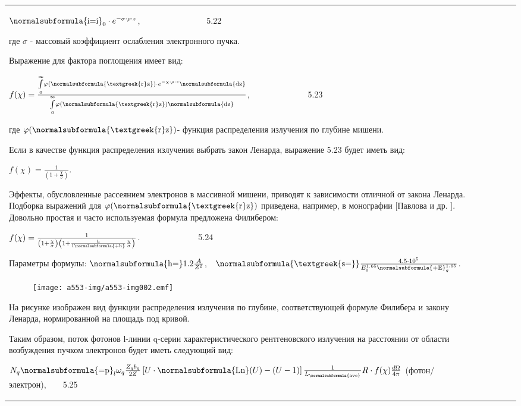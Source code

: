 \documentclass[a4paper,14pt, openany, twoside, draft]{extbook} %
\begin{document}
\begin{flushleft}
\begin{supertabular}{|m{1.7279999cm}|m{1.522cm}|m{1.522cm}|m{1.522cm}|m{1.744cm}|}
 $\normalsubformula{\text{i=i}}_0\cdot e^{-\sigma \cdot \rho \cdot z}$,\ \ \ \ \ \ \ \ \ \ \ \ \ \ \ \ 5.22

где ${\sigma}$ - массовый коэффициент ослабления электронного пучка.

Выражение для фактора поглощения имеет вид:

 $f(\chi )=\frac{\overset{\infty }{\underset 0{\int }}\varphi (\normalsubformula{\text{\textgreek{r}z}})\cdot e^{-\chi \cdot \rho \cdot z}\normalsubformula{\text{dz}}}{\overset{\infty }{\underset 0{\int }}\varphi (\normalsubformula{\text{\textgreek{r}z}})\normalsubformula{\text{dz}}}$,\ \ \ \ \ \ \ \ \ \ \ \ \ \ 5.23

где  $\varphi (\normalsubformula{\text{\textgreek{r}z}})${}- функция распределения излучения по глубине мишени.

Если в качестве функция распределения излучения выбрать закон Ленарда, выражение 5.23 будет иметь вид:

 $f(\chi )=\frac 1{\left(1+\frac{\chi }{\sigma }\right)}$.

Эффекты, обусловленные рассеянием электронов в массивной мишени, приводят к зависимости отличной от закона Ленарда. Подборка выражений для  $\varphi (\normalsubformula{\text{\textgreek{r}z}})$ приведена, например, в монографии [Павлова и др. ]. Довольно простая и часто используемая формула предложена Филибером:

 $f(\chi )=\frac 1{\left(1+\frac{\chi }{\sigma }\right)\left(1+\frac h{1\normalsubformula{\text{+h}}}\frac{\chi }{\sigma }\right)}$.\ \ \ \ \ \ \ \ \ \ \ \ \ \ 5.24

Параметры формулы:  $\normalsubformula{\text{h=}}1.2\frac A{Z^2}$,\ \  $\normalsubformula{\text{\textgreek{s=}}}\frac{4.5\cdot 10^5}{E_0^{1.65}\normalsubformula{\text{+E}}_q^{1.65}}$.



\begin{figure}
\centering
\texttt{[image: a553-img/a553-img002.emf]}
\end{figure}
На рисунке изображен вид функции распределения излучения по глубине, соответствующей формуле Филибера и закону Ленарда, нормированной на площадь под кривой.

Таким образом, поток фотонов l{}-линии q{}-серии характеристического рентгеновского излучения на расстоянии от области возбуждения пучком электронов будет иметь следующий вид:

 $N_q\normalsubformula{\text{=p}}_l\omega _q\frac{Z_qb_q}{2Z}\left[U\cdot \normalsubformula{\text{Ln}}(U)-(U-1)\right]\frac 1{L_{\normalsubformula{\text{ave}}}}R\cdot f(\chi )\frac{d\Omega }{4\pi }$  (фотон/электрон),\ \ \ \ 5.25


\end{supertabular}
\end{flushleft}
\end{document}

